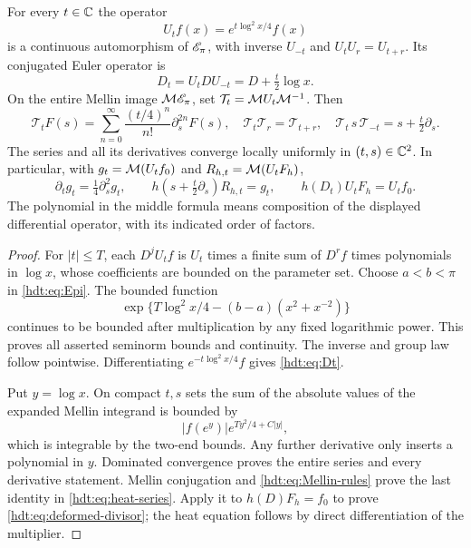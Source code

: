 \documentclass[11pt]{article}
\begin{document}
\begin{hdttheorem}\label{hdt:thm:transport}
For every $t\in\mathbb C$ the operator
\begin{equation}\label{hdt:eq:Ut}
U_tf(x)=e^{t\log^2x/4}f(x)
\end{equation}
is a continuous automorphism of $\mathscr E_\pi$, with inverse $U_{-t}$ and
$U_tU_r=U_{t+r}$. Its conjugated Euler operator is
\begin{equation}\label{hdt:eq:Dt}
D_t=U_tDU_{-t}=D+\tfrac t2\log x.
\end{equation}
On the entire Mellin image $\mathcal M\mathscr E_\pi$, set
$\mathcal T_t=\mathcal M U_t\mathcal M^{-1}$. Then
\begin{equation}\label{hdt:eq:heat-series}
\mathcal T_tF(s)
=\sum_{n=0}^{\infty}\frac{(t/4)^n}{n!}\partial_s^{2n}F(s),
\quad \mathcal T_t\mathcal T_r=\mathcal T_{t+r},\quad
\mathcal T_t\,s\,\mathcal T_{-t}=s+\tfrac t2\partial_s.
\end{equation}
The series and all its derivatives converge locally uniformly in
$(t,s)\in\mathbb C^2$. In particular, with $g_t=\mathcal M(U_tf_0)$ and
$R_{h,t}=\mathcal M(U_tF_h)$,
\begin{equation}\label{hdt:eq:deformed-divisor}
\partial_tg_t=\tfrac14\partial_s^2g_t,\qquad
h\left(s+\tfrac t2\partial_s\right)R_{h,t}=g_t,
\qquad h(D_t)U_tF_h=U_tf_0.
\end{equation}
The polynomial in the middle formula means composition of the
displayed differential operator, with its indicated order of factors.
\end{hdttheorem}
\begin{proof}
For $|t|\leq T$, each $D^jU_tf$ is $U_t$ times a finite sum of
$D^rf$ times polynomials in $\log x$, whose coefficients are bounded
on the parameter set. Choose $a<b<\pi$ in \eqref{hdt:eq:Epi}.
The bounded function
\[
\exp\{T\log^2x/4-(b-a)(x^2+x^{-2})\}
\]
continues to be bounded after multiplication by any fixed
logarithmic power. This proves all asserted seminorm bounds and
continuity. The inverse and group law follow pointwise.
Differentiating $e^{-t\log^2x/4}f$ gives \eqref{hdt:eq:Dt}.

Put $y=\log x$. On compact $t,s$ sets the sum of the absolute
values of the expanded Mellin integrand is bounded by
\[
|f(e^y)|e^{T y^2/4+C|y|},
\]
which is integrable by the two-end bounds. Any further derivative
only inserts a polynomial in $y$. Dominated convergence proves the
entire series and every derivative statement. Mellin conjugation
and \eqref{hdt:eq:Mellin-rules} prove the last identity in
\eqref{hdt:eq:heat-series}. Apply it to $h(D)F_h=f_0$ to prove
\eqref{hdt:eq:deformed-divisor}; the heat equation follows by direct
differentiation of the multiplier.
\end{proof}
\end{document}
